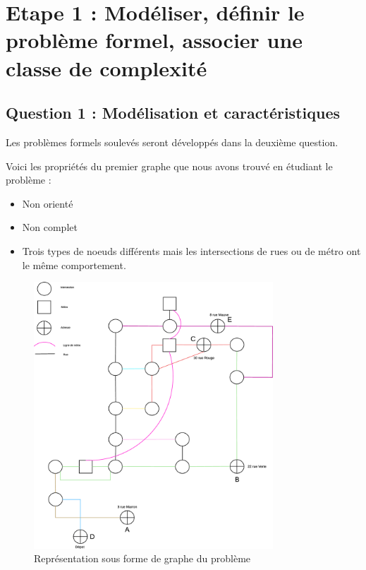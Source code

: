 

\section{Etape 1 : Modéliser, définir le problème formel, associer une classe de complexité}

  \subsection{Question 1 : Modélisation et caractéristiques}

    Les problèmes formels soulevés seront développés dans la deuxième question.

    Voici les propriétés du premier graphe que nous avons trouvé en étudiant le problème :

    \begin{itemize}
     \item Non orienté
     \item Non complet
     \item Trois types de noeuds différents mais les intersections de rues ou de métro ont le même comportement.
    \end{itemize}


    \begin{figure}
            \centering
                \includegraphics[width=0.8\textwidth]{images/graphe.eps}
            \caption{Représentation sous forme de graphe du problème}
            \label{fig:graphe} %
    \end{figure}

